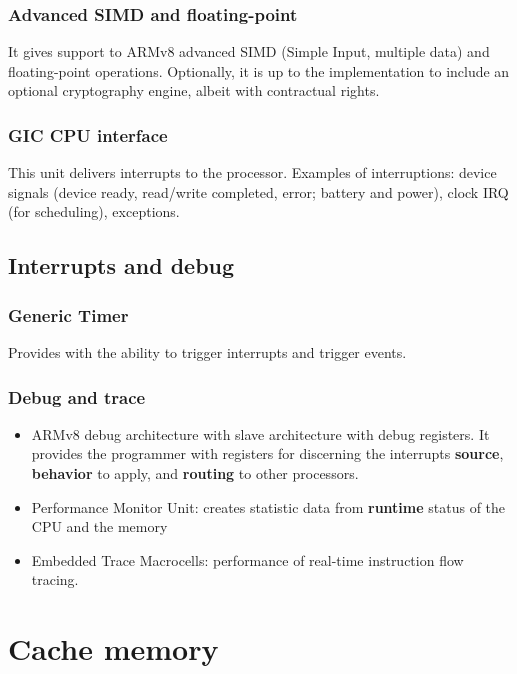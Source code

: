\subsubsection*{Advanced SIMD and floating-point}
It gives support to ARMv8 advanced SIMD (Simple Input, multiple data) and floating-point operations. Optionally, it is up to the implementation to include an optional cryptography engine, albeit with contractual rights. \cite{cortexA72manual}

\subsubsection*{GIC CPU interface} 
\label{gic}
This unit delivers interrupts to the processor. Examples of interruptions: device signals (device ready, read/write completed, error; battery and power), clock IRQ (for scheduling), exceptions. \cite{cortexA72manual}

\subsection*{Interrupts and debug}


\subsubsection*{Generic Timer}
Provides with the ability to trigger interrupts and trigger events. \cite{cortexA72manual}

\subsubsection*{Debug and trace}
\label{debug}

\begin{itemize}
	\item {ARMv8 debug architecture with slave architecture with debug registers. It provides the programmer with registers for discerning the interrupts \textbf{source}, \textbf{behavior} to apply, and \textbf{routing} to other processors.}
	\item {Performance Monitor Unit: creates statistic data from \textbf{runtime} status of the CPU and the memory}
	\item {Embedded Trace Macrocells: performance of real-time instruction flow tracing.}
	
	\cite{cortexA72manual}
\end{itemize}
\section{Cache memory}

